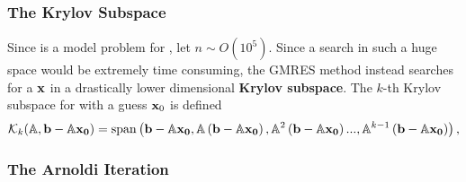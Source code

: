 \subsubsection{The Krylov Subspace}
Since  is a model problem for , let $n \sim O(10^5)$. Since a search in such a huge space would be extremely time consuming, the GMRES method instead searches for a $\mathbf{x}$ in a drastically lower dimensional {\bf Krylov subspace}. The $k$-th Krylov subspace for  with a guess $\mathbf{x}_0$ is defined
\begin{equation}\label{eq:krylov}
\mathcal{K}_k(\mathbb{A},\mathbf{b}-\mathbb{A}\mathbf{x_0}) = \mathrm{span}\left ( \mathbf{b}-\mathbb{A}\mathbf{x_0},\mathbb{A}\left ( \mathbf{b}-\mathbb{A}\mathbf{x_0} \right ),\mathbb{A}^2\left ( \mathbf{b}-\mathbb{A}\mathbf{x_0} \right )...,\mathbb{A}^{k-1}\left ( \mathbf{b}-\mathbb{A}\mathbf{x_0} \right ) \right ),
 \end{equation}

 \subsubsection{The Arnoldi Iteration}
 
